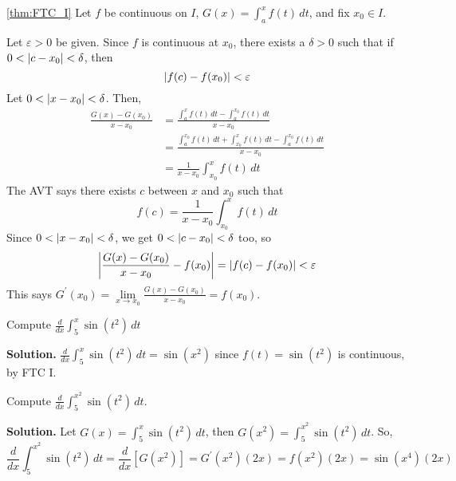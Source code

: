 \begin{Proof}{\ref{thm:FTC_I}}{}
    Let $ f $ be continuous on $ I $, $ \displaystyle G(x)=\int_{a}^{x} f(t)\, d{t} $,
    and fix $ x_0\in I $.

    Let $ \varepsilon>0 $ be given. Since $ f $ is continuous at $ x_0 $,
    there exists a $ \delta>0 $ such that if $ 0<\abs{c-x_0}<\delta $, then
    \[ \abs{f(c)-f(x_0)}<\varepsilon \]
    Let $ 0<\abs{x-x_0}<\delta $. Then,
    \begin{align*}
        \frac{G(x)-G(x_0)}{x-x_0}
         & =\frac{\displaystyle\int_{a}^{x} f(t)\, d{t} -\int_{a}^{x_0} f(t)\, d{t} }
        {x-x_0}                                                                        \\
         & =\frac{\displaystyle\int_{a}^{x_0} f(t)\, d{t} +\int_{x_0}^{x} f(t)\, d{t}-
            \int_{a}^{x_0} f(t)\, d{t} }{x-x_0}                                        \\
         & =\frac{1}{x-x_0} \int_{x_0}^{x} f(t)\, d{t}
    \end{align*}
    The AVT says there exists $ c $ between $ x $ and $ x_0 $ such that
    \[ f(c)=\frac{1}{x-x_0} \int_{x_0}^{x} f(t)\, d{t}  \]
    Since $ 0<\abs{x-x_0}<\delta $, we get $ 0<\abs{c-x_0}<\delta $ too,
    so
    \[
        \abs*{\frac{G(x)-G(x_0)}{x-x_0}-f(x_0)}=\abs{f(c)-f(x_0)}<\varepsilon
    \]
    This says
    $ \displaystyle G^\prime(x_0)=\lim\limits_{{x} \to {x_0}} \frac{G(x)-G(x_0)}{x-x_0}=f(x_0) $.
\end{Proof}

\begin{Example}{}{}
    Compute $ \displaystyle \frac{d}{dx}\int_{5}^{x} \sin(t^2)\, d{t} $

    \textbf{Solution.}
    $ \displaystyle \frac{d}{dx}\int_{5}^{x} \sin(t^2)\, d{t}=\sin(x^2) $
    since $ f(t)=\sin(t^2) $ is continuous, by FTC I.
\end{Example}

\begin{Example}{}{}
    Compute
    $ \displaystyle \frac{d}{dx}\int_{5}^{x^2} \sin(t^2)\, d{t} $.

    \textbf{Solution.} Let $ \displaystyle G(x)=\int_{5}^{x} \sin(t^2)\, d{t} $,
    then $ G(x^2)=\displaystyle \int_{5}^{x^2} \sin(t^2)\, d{t} $. So,
    \[
        \frac{d}{dx} \int_{5}^{x^2} \sin(t^2)\, d{t}
        =\frac{d}{dx} \left[ G(x^2) \right]
        =G^\prime(x^2) (2x)
        =f(x^2)(2x)
        =\sin(x^4) (2x)
    \]
\end{Example}

